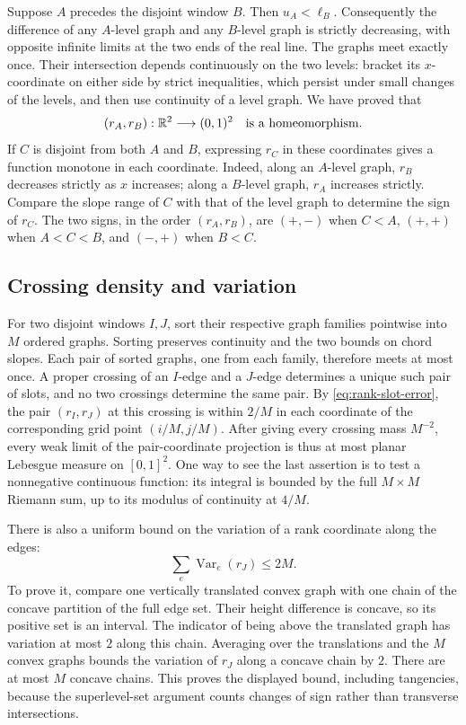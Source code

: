 Suppose $A$ precedes the disjoint window $B$.  Then $u_A<\ell_B$.
Consequently the difference of any $A$-level graph and any $B$-level
graph is strictly decreasing, with opposite infinite limits at the
two ends of the real line.  The graphs meet exactly once.  Their
intersection depends continuously on the two levels: bracket its
$x$-coordinate on either side by strict inequalities, which persist
under small changes of the levels, and then use continuity of a level
graph.  We have proved that
\begin{equation}\label{eq:rank-homeomorphism}
 (r_A,r_B):\mathbb R^2\longrightarrow(0,1)^2
 \quad\hbox{is a homeomorphism}.
\end{equation}
If $C$ is disjoint from both $A$ and $B$, expressing $r_C$ in these
coordinates gives a function monotone in each coordinate.  Indeed,
along an $A$-level graph, $r_B$ decreases strictly as $x$ increases;
along a $B$-level graph, $r_A$ increases strictly.  Compare the slope
range of $C$ with that of the level graph to determine the sign of
$r_C$.  The two signs, in the order $(r_A,r_B)$, are $(+,-)$ when
$C<A$, $(+,+)$ when $A<C<B$, and $(-,+)$ when $B<C$.

\subsection{Crossing density and variation}
For two disjoint windows $I,J$, sort their respective graph families
pointwise into $M$ ordered graphs.  Sorting preserves continuity and
the two bounds on chord slopes.  Each pair of sorted graphs, one from
each family, therefore meets at most once.  A proper crossing of an
$I$-edge and a $J$-edge determines a unique such pair of slots, and no
two crossings determine the same pair.  By
\eqref{eq:rank-slot-error}, the pair $(r_I,r_J)$ at this crossing is
within $2/M$ in each coordinate of the corresponding grid point
$(i/M,j/M)$.  After giving every crossing mass $M^{-2}$, every weak
limit of the pair-coordinate projection is thus at most planar
Lebesgue measure on $[0,1]^2$.  One way to see the last assertion is to
test a nonnegative continuous function: its integral is bounded by the
full $M\times M$ Riemann sum, up to its modulus of continuity at $4/M$.

There is also a uniform bound on the variation of a rank coordinate
along the edges:
\begin{equation}\label{eq:rank-total-variation}
 \sum_e\operatorname{Var}_e(r_J)\le 2M.
\end{equation}
To prove it, compare one vertically translated convex graph with one
chain of the concave partition of the full edge set.  Their height
difference is concave, so its positive set is an interval.  The
indicator of being above the translated graph has variation at most
$2$ along this chain.  Averaging over the translations and the $M$
convex graphs bounds the variation of $r_J$ along a concave chain by
$2$.  There are at most $M$ concave chains.  This proves the displayed
bound, including tangencies, because the superlevel-set argument
counts changes of sign rather than transverse intersections.

